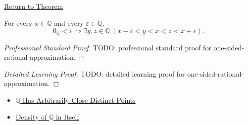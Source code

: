 \newpage
{}
\label{prf:one-sided-rational-approximation}

\begin{remark*}[Return]
\hyperref[prop:one-sided-rational-approximation]{Return to Theorem}
\end{remark*}

\begin{proposition*}
For every $x\in\mathbb{Q}$ and every $\varepsilon\in\mathbb{Q}$,
\[
0_{\mathbb{Q}}<\varepsilon
\Longrightarrow
\exists y,z\in\mathbb{Q}\ (x-\varepsilon<y<x<z<x+\varepsilon).
\]
\end{proposition*}

\begin{proof}[Professional Standard Proof]
\LRAProofBodyStart
TODO: professional standard proof for one-sided-rational-approximation.
\end{proof}

\begin{proof}[Detailed Learning Proof]
\LRAProofBodyStart
TODO: detailed learning proof for one-sided-rational-approximation.
\end{proof}

\begin{remark*}
\end{remark*}

\begin{dependencies}
\begin{itemize}
  \item \hyperref[thm:q-has-arbitrarily-close-distinct-points]{$\mathbb{Q}$ Has Arbitrarily Close Distinct Points}
  \item \hyperref[thm:density-of-q]{Density of $\mathbb{Q}$ in Itself}
\end{itemize}
\end{dependencies}

\clearpage
